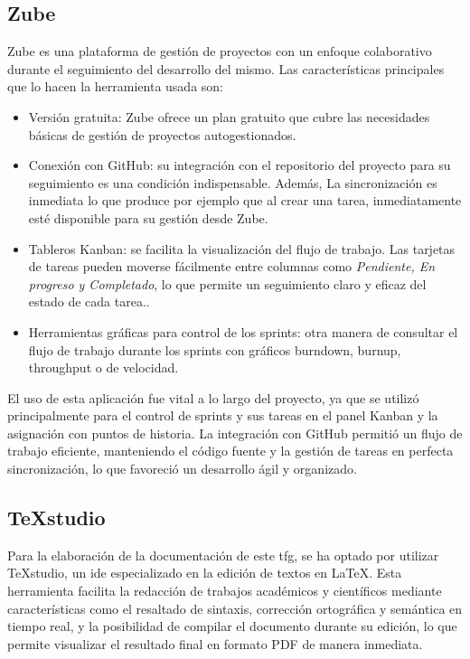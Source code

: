 	\subsection{Zube}
	Zube \cite{zube} es una plataforma de gestión de proyectos con un enfoque colaborativo durante el seguimiento del desarrollo del mismo. Las características principales que lo hacen la herramienta usada son:
	\begin{itemize}
		
		\item Versión gratuita: Zube ofrece un plan gratuito que cubre las necesidades básicas de gestión de proyectos autogestionados.
		
		\item Conexión con GitHub: su integración con el repositorio del proyecto para su seguimiento es una condición indispensable. Además, La sincronización es inmediata lo que produce por ejemplo que al crear una tarea, inmediatamente esté disponible para su gestión desde Zube.
		
		\item Tableros Kanban: se facilita la visualización del flujo de trabajo. Las tarjetas de tareas pueden moverse fácilmente entre columnas como \textit{Pendiente, En progreso y Completado}, lo que permite un seguimiento claro y eficaz del estado de cada tarea..
		
		\item Herramientas gráficas para control de los sprints: otra manera de consultar el flujo de trabajo durante los sprints con gráficos burndown, burnup, throughput o de velocidad.
	 
	\end{itemize}
	
	El uso de esta aplicación fue vital a lo largo del proyecto, ya que se utilizó principalmente para el control de sprints y sus tareas en el panel Kanban y la asignación con puntos de historia. La integración con GitHub permitió un flujo de trabajo eficiente, manteniendo el código fuente y la gestión de tareas en perfecta sincronización, lo que favoreció un desarrollo ágil y organizado. 
	
	\subsection{TeXstudio}
	Para la elaboración de la documentación de este \acrshort{tfg}, se ha optado por utilizar TeXstudio, un \acrfull{ide} especializado en la edición de textos en LaTeX. Esta herramienta facilita la redacción de trabajos académicos y científicos mediante características como el resaltado de sintaxis, corrección ortográfica y semántica en tiempo real, y la posibilidad de compilar el documento durante su edición, lo que permite visualizar el resultado final en formato PDF de manera inmediata.
	
